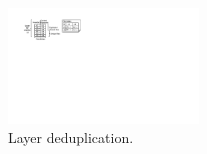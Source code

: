 
\begin{figure}[t]
	\centering
	\centering
	\includegraphics[width=0.45\textwidth]{graphs/sys-architecture-put-layer.pdf}
	\caption{Layer deduplication. }
	\label{fig:dedup-partition}
\end{figure}




